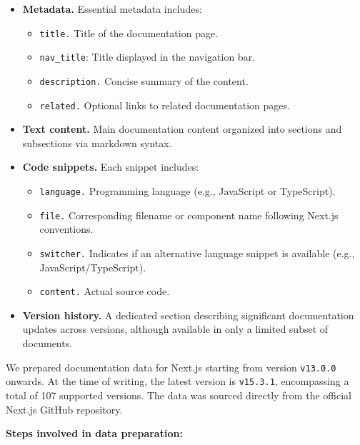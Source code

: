 \begin{itemize}
	\item \textbf{Metadata.} Essential metadata includes:
	\begin{itemize}
		\item \texttt{title.} Title of the documentation page.
		\item \texttt{nav\_title}: Title displayed in the navigation bar.
		\item \texttt{description.} Concise summary of the content.
		\item \texttt{related.} Optional links to related documentation pages.
	\end{itemize}
	
	\item \textbf{Text content.} Main documentation content organized into sections and subsections via markdown syntax.
	
	\item \textbf{Code snippets.} Each snippet includes:
	\begin{itemize}
		\item \texttt{language.} Programming language (e.g., JavaScript or TypeScript).
		\item \texttt{file.} Corresponding filename or component name following Next.js conventions.
		\item \texttt{switcher.} Indicates if an alternative language snippet is available (e.g., JavaScript/TypeScript).
		\item \texttt{content.} Actual source code.
	\end{itemize}
	
	\item \textbf{Version history.} A dedicated section describing significant documentation updates across versions, although available in only a limited subset of documents.
\end{itemize}

We prepared documentation data for Next.js starting from version \texttt{v13.0.0} onwards. At the time of writing, the latest version is \texttt{v15.3.1}, encompassing a total of 107 supported versions. The data was sourced directly from the official Next.js GitHub repository.

\textbf{Steps involved in data preparation:}

